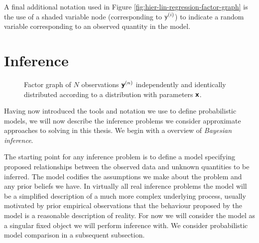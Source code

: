 A final additional notation used in Figure \ref{fig:hier-lin-regression-factor-graph} is the use of a shaded variable node (corresponding to $\mathsf{y}^{(i)}$) to indicate a random variable corresponding to an observed quantity in the model.

\newpage

\section{Inference}

\begin{figure}	
\centering
{}
\caption[Factor graph of \acs{IID} observed variables.]{Factor graph of $N$ observations $\boldsymbol{\mathsf{y}}^{(n)}$ independently and identically distributed according to a distribution with parameters $\boldsymbol{\mathsf{x}}$.}
\label{fig:simple-iid-factor-graph}
\end{figure}

Having now introduced the tools and notation we use to define probabilistic models, we will now describe the inference problems we consider approximate approaches to solving in this thesis. We begin with a overview of \emph{Bayesian inference}.



The starting point for any inference problem is to define a model specifying proposed relationships between the observed data and unknown quantities to be inferred. The model codifies the assumptions we make about the problem and any prior beliefs we have. In virtually all real inference problems the model will be a simplified description of a much more complex underlying process, usually motivated by prior empirical observations that the behaviour proposed by the model is a reasonable description of reality. For now we will consider the model as a singular fixed object we will perform inference with. We consider probabilistic model comparison in a subsequent subsection.

